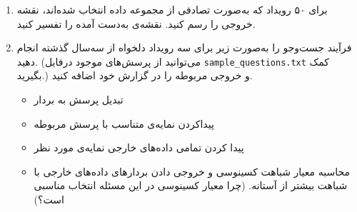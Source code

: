\begin{enumerate}
\begin{qsolve}
		
		
	\end{qsolve}
	
	
	
	
	
	
	
	
	
	
	
	\item برای ۵۰ رویداد که به‌صورت تصادفی از مجموعه داده انتخاب شده‌اند، نقشه خروجی را رسم کنید. نقشه‌ی به‌دست آمده را تفسیر کنید.
	
	
	
	\item فرآیند جست‌و‌جو را به‌صورت زیر برای سه رویداد دلخواه از سه‌سال گذشته انجام دهید. (می‌توانید از پرسش‌های موجود درفایل \texttt{sample\_questions.txt} کمک بگیرید.) و خروجی مربوطه را در گزارش خود اضافه کنید.
	
	\begin{itemize}
		\item تبدیل پرسش به بردار
		\item پیداکردن نمایه‌ی متناسب با پرسش مربوطه
		\item پیدا کردن تمامی داده‌های خارجی نمایه‌ی مورد نظر
		\item محاسبه معیار شباهت کسینوسی و خروجی دادن بردار‌های داده‌های خارجی با شباهت بیشتر از آستانه. (چرا معیار کسینوسی در این مسئله انتخاب مناسبی است؟)
	\end{itemize}
\end{enumerate}


